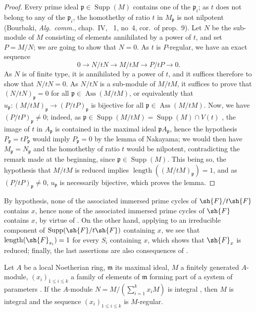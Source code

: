 \begin{proof}
Every prime ideal $\mathfrak{p}\in\operatorname{Supp}(M)$ contains one of the $\mathfrak{p}_i$; as $t$ does not belong to any of the $\mathfrak{p}_i$, the homothethy of ratio $t$ in $M_\mathfrak{p}$ is not nilpotent (Bourbaki, \emph{Alg.\ comm.}, chap.~IV, \textsection~1, no~4, cor.\ of prop.~9).
Let $N$ be the sub-module of $M$ consisting of elements annihilated by a power of $t$, and set $P=M/N$; we are going to show that $N=0$.
As $t$ is $P$-regular, we have an exact sequence 
\[
0\to N/tN\to M/tM\to P/tP\to 0.
\]
As $N$ is of finite type, it is annihilated by a power of $t$, and it suffices therefore to show that $N/tN=0$.
As $N/tN$ is a sub-module of $M/tM$, it suffices to prove that $(N/tN)_\mathfrak{p}=0$ for all $\mathfrak{p}\in\operatorname{Ass}(M/tM)$, or equivalently that $u_\mathfrak{p}:(M/tM)_\mathfrak{p}\to(P/tP)_\mathfrak{p}$ is bijective for all $\mathfrak{p}\in\operatorname{Ass}(M/tM)$.
Now, we have $(P/tP)_\mathfrak{p}\neq 0$; indeed, as $\mathfrak{p}\in\operatorname{Supp}(M/tM)=\operatorname{Supp}(M)\cap V(t)$ , the image of $t$ in $A_\mathfrak{p}$ is contained in the maximal ideal $\mathfrak{p} A_\mathfrak{p}$, hence the hypothesis $P_\mathfrak{p}=tP_\mathfrak{p}$ would imply $P_\mathfrak{p}=0$ by the lemma of Nakayama; we would then have $M_\mathfrak{p}=N_\mathfrak{p}$ and the homothethy of ratio $t$ would be nilpotent, contradicting the remark made at the beginning, since $\mathfrak{p}\in\operatorname{Supp}(M)$.
This being so, the hypothesis that $M/tM$ is reduced implies $\operatorname{length}((M/tM)_\mathfrak{p})=1$, and as $(P/tP)_\mathfrak{p}\neq 0$, $u_\mathfrak{p}$ is necessarily bijective, which proves the lemma.
\end{proof}

By hypothesis, none of the associated immersed prime cycles of $\sh{F}/t\sh{F}$ contains $x$, hence none of the associated immersed prime cycles of $\sh{F}$ contains $x$, by virtue of .
On the other hand, applying  to an irreducible component of $\operatorname{Supp}(\sh{F}/t\sh{F})$ containing $x$, we see that $\operatorname{length}(\sh{F}_{s_i})=1$ for every $S_i$ containing $x$, which shows that $\sh{F}_x$ is reduced; finally, the last assertions are also consequences of .

\begin{corollary}[3.4.7]
\label{IV.3.4.7}
Let $A$ be a local Noetherian ring, $\mathfrak{m}$ its maximal ideal, $M$ a finitely generated $A$-module, $(x_i)_{1\leqslant i\leqslant k}$ a family of elements of $\mathfrak{m}$ forming part of a system of parameters .
If the $A$-module $N=M/(\sum_{i=1}^k x_i M)$ is integral , then $M$ is integral and the sequence $(x_i)_{1\leqslant i\leqslant k}$ is $M$-regular.
\end{corollary}


